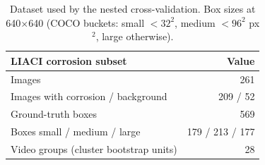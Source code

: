 \begin{table}[htbp]
\centering
\caption{Dataset used by the nested cross-validation. Box sizes at 640$\times$640 (COCO buckets: small $<32^2$, medium $<96^2$ px$^2$, large otherwise).}
\label{tab:dataset}
\begin{tabular}{lr}
\toprule
LIACI corrosion subset & Value \\
\midrule
Images & 261 \\
Images with corrosion / background & 209 / 52 \\
Ground-truth boxes & 569 \\
Boxes small / medium / large & 179 / 213 / 177 \\
Video groups (cluster bootstrap units) & 28 \\
\bottomrule
\end{tabular}
\end{table}
